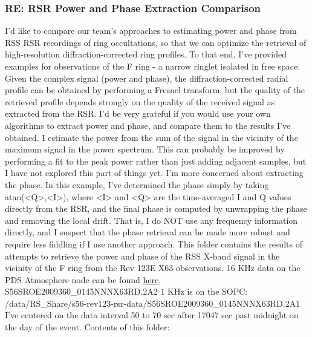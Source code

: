 \documentclass[crop=false,class=book]{standalone}
\begin{document}
\subsubsection{\footnotesize RE: RSR Power and Phase Extraction Comparison}
I'd like to compare our team's approaches to estimating power and phase from RSS RSR recordings of ring occultations, so that we can optimize the retrieval of high-resolution diffraction-corrected ring profiles. To that end, I've provided examples for observations of the F ring - a narrow ringlet isolated in free space. Given the complex signal (power and phase), the diffraction-corrected radial profile can be obtained by performing a Fresnel transform, but the quality of the retrieved profile depends strongly on the quality of the received signal as extracted from the RSR. I'd be very grateful if you would use your own algorithms to extract power and phase, and compare them to the results I've obtained. I estimate the power from the sum of the signal in the vicinity of the maximum signal in the power spectrum. This can probably be improved by performing a fit to the peak power rather than just adding adjacent samples, but I have not explored this part of things yet. I'm more concerned about extracting the phase. In this example, I've determined the phase simply by taking atan(<Q>,<I>), where <I> and <Q> are the time-averaged I and Q values directly from the RSR, and the final phase is computed by unwrapping the phase and removing the local drift. That is, I do NOT use any frequency information directly, and I suspect that the phase retrieval can be made more robust and require less fiddling if I use another approach. This folder contains the results of attempts to retrieve the power and phase of the RSS X-band signal in the vicinity of the F ring from the Rev 123E X63 observations. 16 KHz data on the PDS Atmosphere node can be found \href{https://pds-atmospheres.nmsu.edu/cgi-bin/getdir.pl?volume=cors_0302&dir=SROC10_359/RSR}{here}, S56SROE2009360\_0145NNNX63RD.2A2
1 KHz is on the SOPC: /data/RS\_Share/s56-rev123-rsr-data/S56SROE2009360\_0145NNNX63RD.2A1
I've centered on the data interval 50 to 70 sec after 17047 sec past midnight on the day of the event. Contents of this folder:
\end{document}

